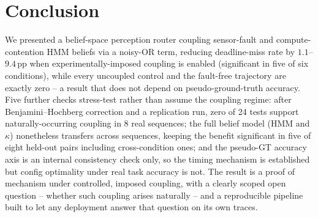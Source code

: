 \documentclass[conference]{IEEEtran}
\begin{document}
\section{Conclusion}
\label{sec:conclusion}

We presented a belief-space perception router coupling sensor-fault
and compute-contention HMM beliefs via a noisy-OR term, reducing
deadline-miss rate by $1.1$--$9.4$\,pp when experimentally-imposed
coupling is enabled (significant in five of six conditions), while
every uncoupled control and the fault-free trajectory are exactly
zero -- a result that does not depend on pseudo-ground-truth
accuracy. Five further checks stress-test rather than assume the
coupling regime: after Benjamini--Hochberg correction and a
replication run, zero of 24 tests support naturally-occurring
coupling in 8 real sequences; the full belief model (HMM and
$\kappa$) nonetheless transfers across sequences, keeping the benefit
significant in five of eight held-out pairs including cross-condition
ones; and the pseudo-GT accuracy axis is an internal
consistency check only, so the timing mechanism is established but
config optimality under real task accuracy is not. The result is a
proof of mechanism under controlled, imposed coupling, with a clearly
scoped open question -- whether such coupling arises naturally -- and
a reproducible pipeline built to let any deployment answer that
question on its own traces.



\end{document}

